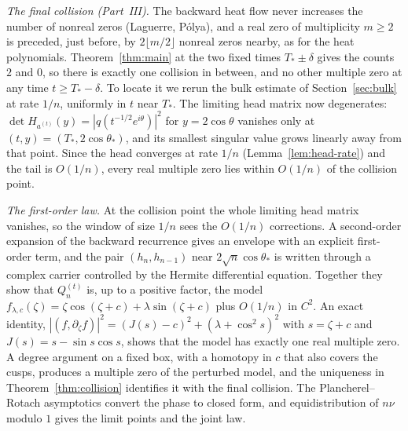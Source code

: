 \documentclass[11pt]{amsart}
\theoremstyle{definition}
\theoremstyle{remark}
\numberwithin{equation}{section}
\begin{document}
\emph{The final collision (Part~III).} The backward heat flow never increases the number of nonreal zeros (Laguerre, P\'olya), and a real zero of multiplicity $m\ge2$ is preceded, just before, by $2\lfloor m/2\rfloor$ nonreal zeros nearby, as for the heat polynomials. Theorem~\ref{thm:main} at the two fixed times $T_*\pm\delta$ gives the counts $2$ and $0$, so there is exactly one collision in between, and no other multiple zero at any time $t\ge T_*-\delta$. To locate it we rerun the bulk estimate of Section~\ref{sec:bulk} at rate $1/n$, uniformly in $t$ near $T_*$. The limiting head matrix now degenerates: $\det H_{a^{(t)}}(y)=|q(t^{-1/2}e^{i\theta})|^2$ for $y=2\cos\theta$ vanishes only at $(t,y)=(T_*,2\cos\theta_*)$, and its smallest singular value grows linearly away from that point. Since the head converges at rate $1/n$ (Lemma~\ref{lem:head-rate}) and the tail is $O(1/n)$, every real multiple zero lies within $O(1/n)$ of the collision point.

\emph{The first-order law.} At the collision point the whole limiting head matrix vanishes, so the window of size $1/n$ sees the $O(1/n)$ corrections. A second-order expansion of the backward recurrence gives an envelope with an explicit first-order term, and the pair $(h_n,h_{n-1})$ near $2\sqrt n\cos\theta_*$ is written through a complex carrier controlled by the Hermite differential equation. Together they show that $Q^{(t)}_n$ is, up to a positive factor, the model $f_{\lambda,c}(\zeta)=\zeta\cos(\zeta+c)+\lambda\sin(\zeta+c)$ plus $O(1/n)$ in $C^2$. An exact identity, $|(f,\partial_\zeta f)|^2=(J(s)-c)^2+(\lambda+\cos^2s)^2$ with $s=\zeta+c$ and $J(s)=s-\sin s\cos s$, shows that the model has exactly one real multiple zero. A degree argument on a fixed box, with a homotopy in $c$ that also covers the cusps, produces a multiple zero of the perturbed model, and the uniqueness in Theorem~\ref{thm:collision} identifies it with the final collision. The Plancherel--Rotach asymptotics convert the phase to closed form, and equidistribution of $n\nu$ modulo $1$ gives the limit points and the joint law.
\end{document}
